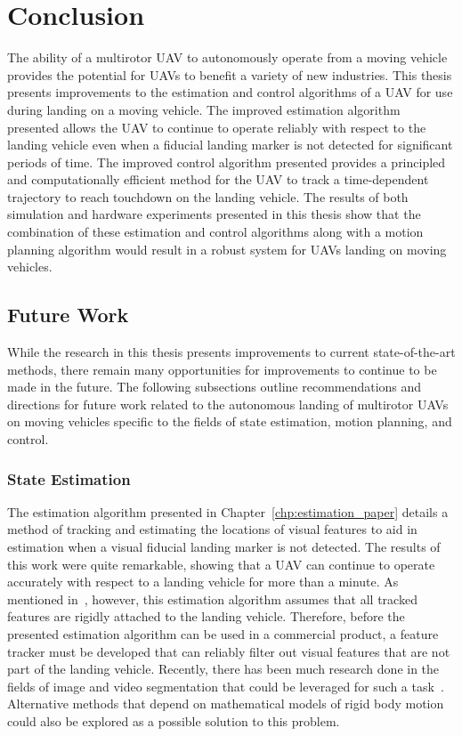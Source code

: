 
\chapter{Conclusion}
\label{chp:conclusion}

The ability of a multirotor UAV to autonomously operate from a moving vehicle
provides the potential for UAVs to benefit a variety of new industries. This
thesis presents improvements to the estimation and control algorithms of a UAV
for use during landing on a moving vehicle. The improved estimation algorithm presented
allows the UAV to continue to operate reliably with respect to the landing vehicle
even when a fiducial landing marker is not detected for significant
periods of time. The improved control algorithm presented provides a principled
and computationally efficient method for the UAV to track a time-dependent
trajectory to reach touchdown on the landing vehicle. The results of both simulation and hardware
experiments presented in this thesis show that the combination of these estimation and control
algorithms along with a motion planning algorithm would result in a robust
system for UAVs landing on moving vehicles.

\section{Future Work}
\label{sec:future_work}
While the research in this thesis presents improvements to current
state-of-the-art methods, there remain many opportunities for improvements to
continue to be made in the future. The following subsections outline
recommendations and directions for future work related to the autonomous
landing of multirotor UAVs on moving vehicles specific to the fields of state
estimation, motion planning, and control.

\subsection{State Estimation}
The estimation algorithm presented in Chapter~\ref{chp:estimation_paper} details
a method of tracking and estimating the locations of visual features 
to aid in estimation when a visual fiducial landing marker is
not detected. The results of this work were quite remarkable, showing that a UAV
can continue to operate accurately with respect to a landing vehicle for more
than a minute. As mentioned in~, however, this estimation algorithm
assumes that all tracked features are rigidly attached to the landing vehicle.
Therefore, before the presented estimation algorithm can be used in a commercial
product, a feature tracker must be developed that can reliably filter out visual
features that are not part of the landing vehicle.
Recently, there has been much research done
in the fields of image and video segmentation that could be leveraged for such a
task~\cite{chen2018encoder}. Alternative methods that depend on
mathematical models of rigid body motion could also be explored as a possible
solution to this problem.

